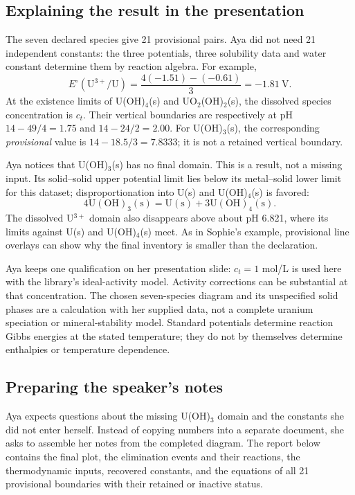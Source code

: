 \documentclass[a4paper,11pt]{ltxdoc}
\begin{document}
\subsection{Explaining the result in the presentation}
The seven declared species give 21 provisional pairs. Aya did not need 21
independent constants: the three potentials, three solubility data and water
constant determine them by reaction algebra. For example,
\[
 E^\circ(\mathrm{U^{3+}/U})=
 \frac{4(-1.51)-(-0.61)}{3}=-1.81\ \mathrm V.
\]
At the existence limits of U(OH)$_4$(s) and UO$_2$(OH)$_2$(s), the dissolved
species concentration is $c_t$. Their vertical boundaries are respectively at
pH $14-49/4=1.75$ and $14-24/2=2.00$.
For U(OH)$_3$(s), the corresponding \emph{provisional} value is
$14-18.5/3=7.8333$; it is not a retained vertical boundary.

Aya notices that U(OH)$_3$(s) has no final domain. This is a result, not a missing
input. Its solid--solid upper potential limit lies below its metal--solid lower
limit for this dataset; disproportionation into U(s) and U(OH)$_4$(s) is favored:
\[
 4\mathrm{U(OH)_3(s)}=
 \mathrm{U(s)}+3\mathrm{U(OH)_4(s)}.
\]
The dissolved U$^{3+}$ domain also disappears above about pH 6.821, where its
limits against U(s) and U(OH)$_4$(s) meet. As in Sophie's example, provisional
line overlays can show why the final inventory is smaller than the declaration.

Aya keeps one qualification on her presentation slide: $c_t=1$ mol/L is used here
with the library's ideal-activity model. Activity corrections can be substantial
at that concentration. The chosen seven-species diagram and its unspecified
solid phases are a calculation with her supplied data, not a complete uranium
speciation or mineral-stability model. Standard potentials determine reaction
Gibbs energies at the stated temperature; they do not by themselves determine
enthalpies or temperature dependence.

\subsection{Preparing the speaker's notes}
Aya expects questions about the missing U(OH)$_3$ domain and the constants she
did not enter herself. Instead of copying numbers into a separate document,
she asks  to assemble her notes from the completed
diagram. The report below contains the final plot, the elimination events and
their reactions, the thermodynamic inputs, recovered constants, and the equations
of all 21 provisional boundaries with their retained or inactive status.
\end{document}
